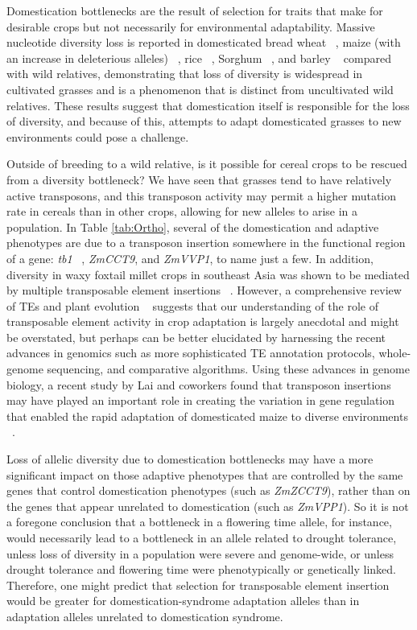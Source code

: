 \documentclass[12pt]{article}
\begin{document}
Domestication bottlenecks are the result of selection for traits that make for desirable crops but not necessarily for environmental adaptability. Massive nucleotide diversity loss is reported in domesticated bread wheat ~\citep{Haudry2007}, maize (with an increase in deleterious alleles) ~\citep{pmid9539756, Wang2017}, rice ~\citep{pmid17218640}, Sorghum ~\citep{Hamblin2006}, and barley ~\citep{Kilian2006} compared with wild relatives, demonstrating that loss of diversity is widespread in cultivated grasses and is a phenomenon that is distinct from uncultivated wild relatives. These results suggest that domestication itself is responsible for the loss of diversity, and because of this, attempts to adapt domesticated grasses to new environments could pose a challenge.  

Outside of breeding to a wild relative, is it possible for cereal crops to be rescued from a diversity bottleneck? We have seen that grasses tend to have relatively active transposons, and this transposon activity may permit a higher mutation rate in cereals than in other crops, allowing for new alleles to arise in a population.  In Table \ref{tab:Ortho}, several of the domestication and adaptive phenotypes are due to a transposon insertion somewhere in the functional region of a gene: \textit{tb1} ~\citep{Studer2011}, \textit{ZmCCT9}, and \textit{ZmVVP1}, to name just a few. In addition, diversity in waxy foxtail millet crops in southeast Asia was shown to be mediated by multiple transposable element insertions ~\citep{Kawase2005}. However, a comprehensive review of TEs and plant evolution ~\citep{Lisch2001} suggests that our understanding of the role of transposable element activity in crop adaptation is largely anecdotal and might be overstated, but perhaps can be better elucidated by harnessing the recent advances in genomics such as more sophisticated TE annotation protocols, whole-genome sequencing, and comparative algorithms.  Using these advances in genome biology, a recent study by Lai and coworkers found that transposon insertions may have played an important role in creating the variation in gene regulation that enabled the rapid adaptation of domesticated maize to diverse environments ~\citep{Lai2017}. 

Loss of allelic diversity due to domestication bottlenecks may have a more significant impact on those adaptive phenotypes that are controlled by the same genes that control domestication phenotypes (such as \textit{ZmZCCT9}), rather than on the genes that appear unrelated to domestication (such as \textit{ZmVPP1}).  So it is not a foregone conclusion that a bottleneck in a flowering time allele, for instance, would necessarily lead to a bottleneck in an allele related to drought tolerance, unless loss of diversity in a population were severe and genome-wide, or unless drought tolerance and flowering time were phenotypically or genetically linked. Therefore, one might predict that selection for transposable element insertion would be greater for domestication-syndrome adaptation alleles than in adaptation alleles unrelated to domestication syndrome.  
\end{document}
